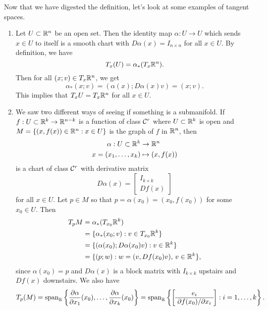 Now that we have digested the definition, let's look at some examples of tangent spaces.
\begin{enumerate}[(1)]
    \item Let $U \subset \mathbb{R}^n$ be an open set. Then the identity map 
    $\alpha : U \to U$ which sends $x \in U$ to itself is a smooth 
    chart with $D\alpha(x) = I_{n\times n}$ for all $x \in U$. By 
    definition, we have  
    \[ T_x(U) = \alpha_*(T_x\mathbb{R}^n). \] 
    Then for all $(x; v) \in T_x\mathbb{R}^n$, we get 
    \[ \alpha_*(x; v) = (\alpha(x); D\alpha(x)v) = (x; v). \] 
    This implies that $T_xU = T_x\mathbb{R}^n$ for all $x \in U$. 

    \item We saw two different ways of seeing if something is a submanifold. If $f : U \subset \mathbb{R}^k 
    \to \mathbb{R}^{n-k}$ is a function of class ${\cal C}^r$ where $U \subset \mathbb{R}^k$ is open and 
    $M = \{(x, f(x)) \in \mathbb{R}^n : x \in U\}$ is the graph of $f$ in $\mathbb{R}^n$, then 
    \begin{align*}
        \alpha : U \subset \mathbb{R}^k &\to \mathbb{R}^n \\ 
        x = (x_1, \dots, x_k) &\mapsto (x, f(x))
    \end{align*}
    is a chart of class ${\cal C}^r$ with derivative matrix 
    \[ D\alpha(x) = \left[ \begin{array}{c} 
        I_{k\times k} \\\hline \!Df(x)\!
    \end{array} \right] \] 
    for all $x \in U$. Let $p \in M$ so that $p = \alpha(x_0) = (x_0, f(x_0))$ for some $x_0 \in U$. Then 
    \begin{align*} 
        T_pM &= \alpha_*(T_{x_0}\mathbb{R}^k) \\
        &= \{\alpha_*(x_0; v) : v \in T_{x_0}\mathbb{R}^k\} \\
        &= \{(\alpha(x_0); D\alpha(x_0)v) : v \in \mathbb{R}^k\} \\ 
        &= \{(p; w) : w = (v, Df(x_0)v),\, v \in \mathbb{R}^k\}, 
    \end{align*} 
    since $\alpha(x_0) = p$ and $D\alpha(x)$ is a block matrix with $I_{k\times k}$ 
    upstairs and $Df(x)$ downstairs. We also have 
    \[ T_p(M) = {\rm span}_{\mathbb{R}} \left\{ \frac{\partial\alpha}{\partial x_1}(x_0), \dots, 
    \frac{\partial\alpha}{\partial x_k}(x_0) \right\} = {\rm span}_{\mathbb{R}} 
    \left\{ \left[ \begin{array}{c} 
        e_i \\\hline \!\partial f(x_0)/\partial x_i\!
    \end{array} \right] : 
    i = 1, \dots, k \right\}. \] 


\end{enumerate}
